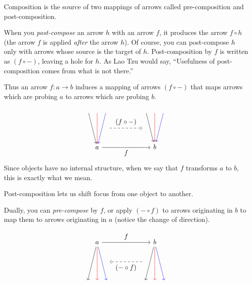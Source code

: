 \documentclass[DaoFP]{subfiles}
\begin{document}
Composition is the source of two mappings of arrows called pre-composition and post-composition. 

When you \emph{post-compose} an arrow $h$ with an arrow $f$, it produces the arrow $f \circ h$ (the arrow $f$ is applied \emph{after} the arrow $h$). Of course, you can post-compose $h$ only with arrows whose source is the target of $h$. Post-composition by $f$ is written as $(f \circ -)$, leaving a hole for $h$. As Lao Tzu would say, ``Usefulness of post-composition comes from what is not there.''

Thus an arrow $f \colon a \to b$ induces a mapping of arrows $(f \circ -)$ that maps arrows which are probing $a$ to arrows which are probing $b$. 

\[
 \begin{tikzcd}
 \node (a1) at (0, 2) {};
 \node (a2) at (-0.5, 2) {};
 \node (a3) at (0.5, 2) {};
 \node (aa) at (0.5, 1) {};
 \node(a) at (0, 0) {a};
 \draw[->, red] (a1) -- (a);
 \draw[->] (a2) -- (a);
 \draw[->, blue] (a3) -- (a);
 \node (b1) at (3+0, 2) {};
 \node (b2) at (3-0.5, 2) {};
 \node (b3) at (3+0.5, 2) {};
 \node (bb) at (2.5, 1) {};
 \node(b) at (3, 0) {b};
 \draw[->, red] (b1) -- (b);
 \draw[->] (b2) -- (b);
 \draw[->, blue] (b3) -- (b);
 \draw[->] (a) -- node[below]{f} (b);
 \draw[->, dashed] (aa) -- node[above]{(f \circ -)} (bb);
  \end{tikzcd}
\]
Since objects have no internal structure, when we say that $f$ transforms $a$ to $b$, this is exactly what we mean. 

Post-composition lets us shift focus from one object to another.

Dually, you can \emph{pre-compose} by $f$, or apply $(- \circ f)$ to arrows originating in $b$ to map them to arrows originating in $a$ (notice the change of direction). 

\[
 \begin{tikzcd}
 \node (a1) at (0, -2) {};
 \node (a2) at (-0.5, -2) {};
 \node (a3) at (0.5, -2) {};
 \node (aa) at (0.5, -1) {};
 \node(a) at (0, 0) {a};
 \draw[<-, red] (a1) -- (a);
 \draw[<-] (a2) -- (a);
 \draw[<-, blue] (a3) -- (a);
 \node (b1) at (3+0, -2) {};
 \node (b2) at (3-0.5, -2) {};
 \node (b3) at (3+0.5, -2) {};
 \node (bb) at (2.5, -1) {};
 \node(b) at (3, 0) {b};
 \draw[<-, red] (b1) -- (b);
 \draw[<-] (b2) -- (b);
 \draw[<-, blue] (b3) -- (b);
 \draw[->] (a) -- node[above]{f} (b);
 \draw[->, dashed] (bb) -- node[below]{(- \circ f)} (aa);
  \end{tikzcd}
\]
\end{document}
